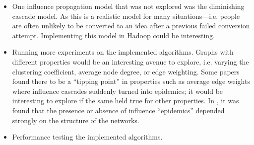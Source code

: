 \begin{itemize}
	\item One influence propagation model that was not explored was the diminishing cascade model. As this is a realistic model for many situations---i.e. people are often unlikely to be converted to an idea after a previous failed conversion attempt. Implementing this model in Hadoop could be interesting.
	\item Running more experiments on the implemented algorithms. Graphs with different properties would be an interesting avenue to explore, i.e. varying the clustering coefficient, average node degree, or edge weighting. Some papers found there to be a ``tipping point'' in properties such as average edge weights where influence cascades suddenly turned into epidemics; it would be interesting to explore if the same held true for other properties. In \cite{digg}, it was found that the presence or absence of influence ``epidemics'' depended strongly on the structure of the networks.
	\item Performance testing the implemented algorithms.
\end{itemize}



